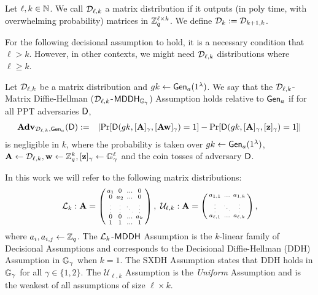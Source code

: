 \begin{definition}   \label{def:matrixdef}
Let $\ell,k \in \mathbb{N}$.
We call $\mathcal{D}_{\ell,k}$ a matrix distribution if it outputs (in poly time, with overwhelming probability) matrices in $\mathbb{Z}_q^{\ell \times k}$. We define $\mathcal{D}_k := \mathcal{D}_{k+1,k}$. 
\end{definition}

For the following decisional assumption to hold, it is a necessary condition that $\ell>k$. However, in other contexts, we might need $\mathcal{D}_{\ell,k}$ distributions where 
$\ell \geq k$. 

\begin{definition}\label{def:mdh}
Let $\mathcal{D}_{\ell,k}$ be a matrix distribution  and ${gk}\gets \mathsf{Gen}_a(1^\lambda)$. We say that the $\mathcal{D}_{\ell,k}$-Matrix Diffie-Hellman ($\mathcal{D}_{\ell,k}$-$\mathsf{MDDH}_{\mathbb{G}_\gamma}$)
Assumption holds relative to $\mathsf{Gen}_a$ if for all PPT adversaries $\mathsf{D}$,
\begin{eqnarray*}
\mathbf{Adv}_{\mathcal{D}_{\ell,k},\mathsf{Gen}_a}(\mathsf{D}) & := &
    \left|
        \Pr[\mathsf{D}({gk},[\mathbf{{A}}]_\gamma,[\mathbf{{A}}\mathbf{w}]_\gamma)=1]-
        \Pr[\mathsf{D}({gk},[\mathbf{{A}}]_\gamma, [\mathbf{z}]_\gamma) =1]
    \right|
\end{eqnarray*}
is negligible in $k$,
where the probability is taken over ${gk} \gets \mathsf{Gen}_a(1^\lambda)$, $\mathbf{{A}} \gets \mathcal{D}_{\ell,k}, \mathbf{w} \gets \mathbb{Z}_q^k, [\mathbf{z}]_\gamma  \gets \mathbb{G}_\gamma^{\ell}$ and the coin tosses of adversary $\mathsf{D}$.
\end{definition}
 

In this work we will refer to the following matrix distributions: 
\[
\distlin_{k}:\matrA = \left( \begin{smallmatrix}
    a_1 & 0 &  \ldots & 0 \\
    0 &  a_2 &  \ldots & 0\\
    \tiny{\vdots} &  \tiny{\vdots}  &  \tiny{\ddots} & \tiny{\vdots} \\
    0 & 0 &  \ldots  & a_{k}\\
    1 & 1 & \ldots & 1
\end{smallmatrix} \right),
\ 
\mathcal{U}_{\ell,k}: \matrA = \left( \begin{smallmatrix}
    a_{1,1} &  \ldots & a_{1,k}  \\
    \tiny{\vdots} & \tiny{\ddots}  & \tiny{\vdots} \\
    a_{\ell,1} &  \ldots &  a_{\ell,k} 
\end{smallmatrix} \right),
\]
where $a_i,a_{i,j}\leftarrow \mathbb{Z}_q$.  The $\mathcal{L}_{k}$-$\mathsf{MDDH}$ Assumption is the $k$-linear family of Decisional Assumptions
and corresponds to 
 the Decisional Diffie-Hellman (DDH)
Assumption in $\mathbb{G}_\gamma$ when $k=1$. The SXDH Assumption states that DDH holds in $\mathbb{G}_\gamma$ for all $\gamma \in \{1,2\}$. The $\mathcal{U}_{\ell,k}$ Assumption is the \textit{Uniform} Assumption and is the weakest of all assumptions of size $\ell \times k$. 

